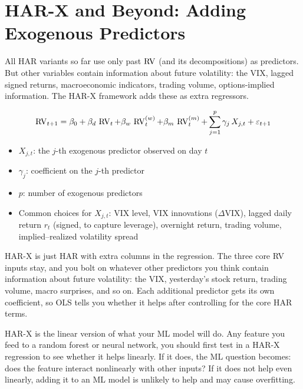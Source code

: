 \section{HAR-X and Beyond: Adding Exogenous Predictors}
\label{sec:har-x}

All HAR variants so far use only past $\operatorname{RV}$ (and its decompositions) as predictors.
But other variables contain information about future volatility: the VIX, lagged signed returns, macroeconomic indicators, trading volume, options-implied information.
The HAR-X framework adds these as extra regressors.

\begin{definition}[HAR-X]
\begin{equation}
  \operatorname{RV}_{t+1} = \beta_0 + \beta_d \, \operatorname{RV}_t + \beta_w \, \operatorname{RV}^{(w)}_t + \beta_m \, \operatorname{RV}^{(m)}_t
             + \sum_{j=1}^{p} \gamma_j \, X_{j,t} + \varepsilon_{t+1}
  \label{eq:har-x}
\end{equation}
\begin{itemize}[nosep]
  \item $X_{j,t}$: the $j$-th exogenous predictor observed on day $t$
  \item $\gamma_j$: coefficient on the $j$-th predictor
  \item $p$: number of exogenous predictors
  \item Common choices for $X_{j,t}$: VIX level, VIX innovations ($\Delta$VIX), lagged daily return $r_t$ (signed, to capture leverage), overnight return, trading volume, implied--realized volatility spread
\end{itemize}
\end{definition}

\begin{intuition}
HAR-X is just HAR with extra columns in the regression.
The three core RV inputs stay, and you bolt on whatever other predictors you think contain information about future volatility: the VIX, yesterday's stock return, trading volume, macro surprises, and so on.
Each additional predictor gets its own coefficient, so OLS tells you whether it helps after controlling for the core HAR terms.
\end{intuition}

\begin{projectconnection}
HAR-X is the linear version of what your ML model will do.
Any feature you feed to a random forest or neural network, you should first test in a HAR-X regression to see whether it helps linearly.
If it does, the ML question becomes: does the feature interact nonlinearly with other inputs?
If it does not help even linearly, adding it to an ML model is unlikely to help and may cause overfitting.
\end{projectconnection}

